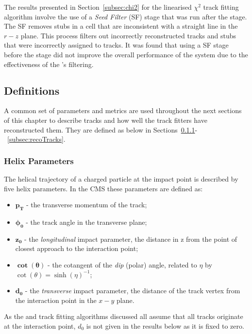 The results presented in Section~\ref{subsec:chi2} for the linearised $\chi^{2}$ track fitting algorithm involve the use of a \emph{Seed Filter} (SF) stage that was run after the \HT stage.
The SF removes stubs in a \HT cell that are inconsistent with a straight line in the \emph{$r-z$} plane.
This process filters out incorrectly reconstructed tracks and stubs that were incorrectly assigned to tracks.
It was found that using a SF stage before the \KF stage did not improve the overall performance of the system due to the effectiveness of the \KF's filtering.

\subsection{Definitions}\label{subsec:definitions}
A common set of parameters and metrics are used throughout the next sections of this chapter to describe tracks and how well the track fitters have reconstructed them.
They are defined as below in Sections~\ref{subsec:helixParameter}-~\ref{subsec:recoTracks}.

\subsubsection{Helix Parameters}\label{subsec:helixParameter}
The helical trajectory of a charged particle at the impact point is described by five helix parameters.
In the CMS these parameters are defined as:

\begin{itemize}
\item $\bm{p_{T}}$ - the transverse momentum of the track;
\item $\bm{\phi_{0}}$ - the track angle in the transverse plane;
\item $\bm{z_{0}}$ - the \emph{longitudinal} impact parameter, \ie the distance in z from the point of closest approach to the interaction point;
\item $\bm{\cot(\theta)}$ - the cotangent of the \emph{dip} (polar) angle, related to $\eta$ by $\cot(\theta) = \sinh (\eta)^{-1}$;
\item $\bm{d_{0}}$ - the \emph{transverse} impact parameter, \ie the distance of the track vertex from the interaction point in the $x-y$ plane. 
\end{itemize}

As the \HT and track fitting algorithms discussed all assume that all tracks originate at the interaction point, $d_{0}$ is not given in the results below as it is fixed to zero.

